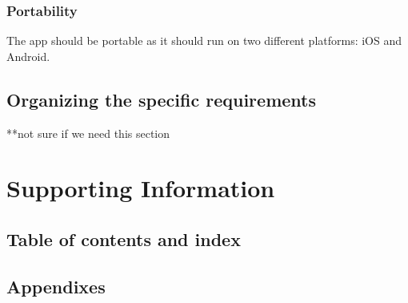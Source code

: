 \documentclass[letterpaper,10pt,draftclsnofoot,onecolumn,compsoc,titlepage]{IEEEtran}
\begin{document}
	\subsubsection{Portability} The app should be portable as it should run on two different platforms: iOS and Android.

	\subsection{Organizing the specific requirements}
	**not sure if we need this section

	\section{Supporting Information}
	\subsection{Table of contents and index}
	\subsection{Appendixes}
\end{document}
